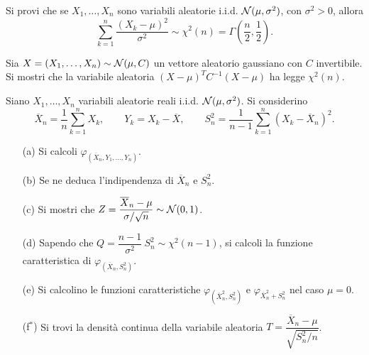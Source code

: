 \Esercizio{} %
Si provi che se $X_1,\dots,X_n$ sono variabili aleatorie i.i.d. $\mathcal{N}(\mu,\sigma^2)$, con $\sigma^2>0$, allora 
\[
\sum_{k=1}^{n}\frac{(X_k-\mu)^2}{\sigma^2}\sim\chi^2(n)=\Gamma\left(\frac{n}{2},\frac{1}{2}  \right).
\]

\Esercizio{} %
Sia $X=(X_1,\dots,X_n)\sim\mathcal{N}(\mu,C)$ un vettore aleatorio gaussiano con $C$ invertibile. Si mostri che la variabile aleatoria $(X-\mu)^TC^{-1}(X-\mu)$ ha legge $\chi^2(n)$.

\Esercizio{} %
Siano $X_1,\dots,X_n$ variabili aleatorie reali i.i.d. $\mathcal{N}(\mu,\sigma^2)$.  Si considerino
\[
\overline{X}_n=\frac{1}{n}\sum_{k=1}^nX_k,\qquad Y_k=X_k-\overline{X},\qquad S_n^2=\frac{1}{n-1}\sum_{k=1}^n(X_k-\overline{X}_n)^2.
\]
\begin{enumerate}
\item [(a)] Si calcoli $\varphi_{(\overline{X}_n,Y_1,\dots,Y_n)}$.
\item [(b)] Se ne deduca l'indipendenza di $\overline{X}_n$ e $S_n^2$.
\item [(c)] Si mostri che $Z=\dfrac{\overline{X}_n-\mu}{\sigma/\sqrt{n}}\sim\mathcal{N}(0,1)$.
\item [(d)] Sapendo che $Q=\dfrac{n-1}{\sigma^2}\ S_n^2\sim\chi^2(n-1)$, si calcoli la funzione caratteristica di $\varphi_{(\overline{X}_n,S_n^2)}$.
\item [(e)] Si calcolino le funzioni caratteristiche $\varphi_{(\overline{X}_n^2,S_n^2)}$ e $\varphi_{\overline{X}_n^2+S_n^2}$ nel caso $\mu=0$.
\item [(f$^*$)] Si trovi la densità continua della variabile aleatoria $T=\dfrac{\overline{X}_n-\mu}{\sqrt{S_n^2/n}}$.
\end{enumerate}

\ParteSoluzioni

